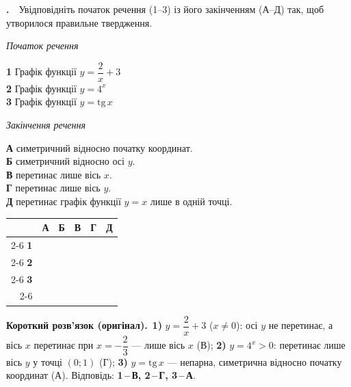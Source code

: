 \documentclass[12pt]{article}
\newcommand{\matchingGrid}{%
    \begingroup
    \renewcommand{\arraystretch}{1.15}
    \setlength{\tabcolsep}{4pt}
    \footnotesize
    \begin{tabular}{r|c|c|c|c|c|}
         \multicolumn{1}{c}{} & \multicolumn{1}{c}{\textbf{А}} & \multicolumn{1}{c}{\textbf{Б}} & \multicolumn{1}{c}{\textbf{В}} & \multicolumn{1}{c}{\textbf{Г}} & \multicolumn{1}{c}{\textbf{Д}} \\ \cline{2-6}
         \textbf{1} & \phantom{X} & \phantom{X} & \phantom{X} & \phantom{X} & \phantom{X} \\ \cline{2-6}
         \textbf{2} & & & & & \\ \cline{2-6}
         \textbf{3} & & & & & \\ \cline{2-6}
    \end{tabular}
    \endgroup
}
\newcounter{zad}
\newcommand{\zadtask}[1]{\stepcounter{zad}\noindent\textbf{\thezad.}\ \ #1\par\vspace{0.2cm}}
\newcommand{\solution}[1]{%
\par\vspace{0.12cm}
\begin{tcolorbox}[colback=titleBg!45, colframe=mainGreen!55, boxrule=0.4pt, arc=2pt,
    left=6pt, right=6pt, top=3pt, bottom=3pt, breakable]
\footnotesize\textbf{Короткий розв'язок (оригінал).}\ #1
\end{tcolorbox}
\par\vspace{0.12cm}
}
\begin{document}
\zadtask{Увідповідніть початок речення (1--3) із його закінченням (А--Д) так, щоб утворилося правильне твердження.

\vspace{0.2cm}
\noindent
\begin{minipage}[t]{0.42\textwidth}
\textit{Початок речення}\par\vspace{0.2cm}
\textbf{1} \quad Графік функції $y = \dfrac{2}{x} + 3$\\[0.4cm]
\textbf{2} \quad Графік функції $y = 4^x$\\[0.3cm]
\textbf{3} \quad Графік функції $y = \mathrm{tg}\,x$
\end{minipage}
\hfill
\begin{minipage}[t]{0.42\textwidth}
\textit{Закінчення речення}\par\vspace{0.2cm}
\textbf{А} \quad симетричний відносно початку координат.\\[0.15cm]
\textbf{Б} \quad симетричний відносно осі $y$.\\[0.15cm]
\textbf{В} \quad перетинає лише вісь $x$.\\[0.15cm]
\textbf{Г} \quad перетинає лише вісь $y$.\\[0.15cm]
\textbf{Д} \quad перетинає графік функції $y = x$ лише в одній точці.
\end{minipage}
\hfill
\begin{minipage}[t]{0.14\textwidth}
\vspace{0.4cm}
\begin{flushright}\matchingGrid\end{flushright}
\end{minipage}
}
\solution{\textbf{1)} $y=\dfrac{2}{x}+3$ ($x\ne0$): осі $y$ не перетинає, а вісь $x$ перетинає при $x=-\dfrac{2}{3}$ --- лише вісь $x$ (В); \textbf{2)} $y=4^x>0$: перетинає лише вісь $y$ у точці $(0;1)$ (Г); \textbf{3)} $y=\mathrm{tg}\,x$ --- непарна, симетрична відносно початку координат (А). Відповідь: \textbf{1\,--\,В, 2\,--\,Г, 3\,--\,А}.}
\end{document}
